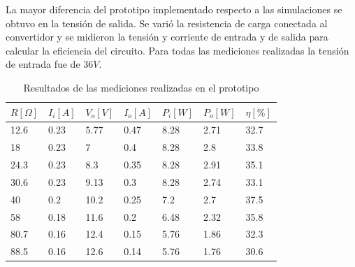 La mayor diferencia del prototipo implementado respecto a las simulaciones se obtuvo en la tensión de salida. 
Se varió la resistencia de carga conectada al convertidor y se midieron la tensión y corriente de entrada y de salida para calcular la eficiencia del circuito.
Para todas las mediciones realizadas la tensión de entrada fue de $36V$.

\begin{table}[H]
    \centering
    \begin{tabular}{lllllll}
        \hline
        \multicolumn{1}{c}{$R[\Omega]$} & \multicolumn{1}{c}{$I_i[A]$} & \multicolumn{1}{c}{$V_o[V]$} & \multicolumn{1}{c}{$I_o[A]$} & \multicolumn{1}{c}{$P_i[W]$} & \multicolumn{1}{c}{$P_o[W]$} & \multicolumn{1}{c}{$\eta[\%]$} \\ \hline
        12.6                            & 0.23                         & 5.77                         & 0.47                         & 8.28                         & 2.71                         & 32.7                           \\
        18                              & 0.23                         & 7                            & 0.4                          & 8.28                         & 2.8                          & 33.8                           \\
        24.3                            & 0.23                         & 8.3                          & 0.35                         & 8.28                         & 2.91                         & 35.1                           \\
        30.6                            & 0.23                         & 9.13                         & 0.3                          & 8.28                         & 2.74                         & 33.1                           \\
        40                              & 0.2                          & 10.2                         & 0.25                         & 7.2                          & 2.7                          & 37.5                           \\
        58                              & 0.18                         & 11.6                         & 0.2                          & 6.48                         & 2.32                         & 35.8                           \\
        80.7                            & 0.16                         & 12.4                         & 0.15                         & 5.76                         & 1.86                         & 32.3                           \\
        88.5                            & 0.16                         & 12.6                         & 0.14                         & 5.76                         & 1.76                         & 30.6                           \\ \hline
    \end{tabular}
    \caption{Resultados de las mediciones realizadas en el prototipo}
    \label{tab:mediciones}
\end{table}

